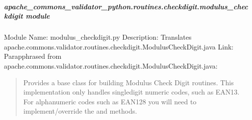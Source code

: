 \documentclass[letterpaper,10pt,english]{sphinxmanual}
\begin{document}
\subparagraph{apache\_commons\_validator\_python.routines.checkdigit.modulus\_checkdigit module}
\label{\detokenize{apache_commons_validator_python.routines.checkdigit:module-apache_commons_validator_python.routines.checkdigit.modulus_checkdigit}}\label{\detokenize{apache_commons_validator_python.routines.checkdigit:apache-commons-validator-python-routines-checkdigit-modulus-checkdigit-module}}
\sphinxAtStartPar
Module Name: modulus\_checkdigit.py
Description: Translates apache.commons.validator.routines.checkdigit.ModulusCheckDigit.java
Link: 
Parapphrased from apache.commons.validator.routines.checkdigit.ModulusCheckDigit.java:
\begin{quote}
\begin{description}
\sphinxAtStartPar
Provides a base class for building Modulus Check Digit routines.
This implementation only handles single\sphinxhyphen{}digit numeric codes, such as EAN\sphinxhyphen{}13.
For alphanumeric codes such as EAN\sphinxhyphen{}128 you will need to implement/override the  and  methods.

\end{description}
\end{quote}
\end{document}
